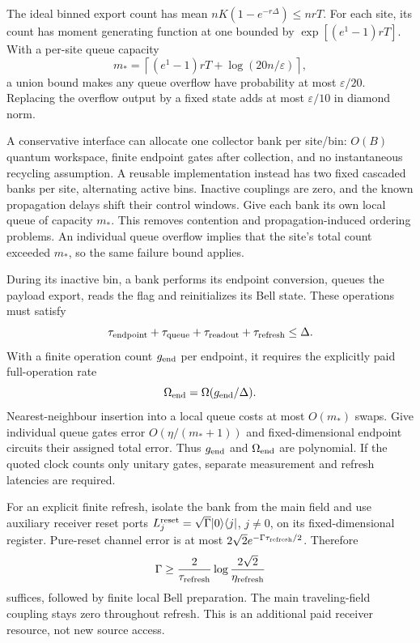\documentclass[11pt,a4paper]{article}
\begin{document}
The ideal binned export count has mean $nK(1-e^{-r\Delta})\le nrT$. For each site, its count has moment generating function at one bounded by $\exp[(e^{1}-1)rT]$. With a per-site queue capacity
\begin{equation}
m_* =\left\lceil(e^{1}-1)rT+\log(20n/\varepsilon)\right\rceil,
\end{equation}
a union bound makes any queue overflow have probability at most $\varepsilon/20$. Replacing the overflow output by a fixed state adds at most $\varepsilon/10$ in diamond norm.

A conservative interface can allocate one collector bank per site/bin: $O(B)$ quantum workspace, finite endpoint gates after collection, and no instantaneous recycling assumption. A reusable implementation instead has two fixed cascaded banks per site, alternating active bins. Inactive couplings are zero, and the known propagation delays shift their control windows. Give each bank its own local queue of capacity $m_*$. This removes contention and propagation-induced ordering problems. An individual queue overflow implies that the site's total count exceeded $m_*$, so the same failure bound applies.

During its inactive bin, a bank performs its endpoint conversion, queues the payload export, reads the flag and reinitializes its Bell state. These operations must satisfy
\begin{equation}
\tau_{\rm endpoint}+\tau_{\rm queue}+\tau_{\rm readout}+\tau_{\rm refresh}\le\Delta.
\end{equation}
With a finite operation count $g_{\rm end}$ per endpoint, it requires the explicitly paid full-operation rate
\begin{equation}
\Omega_{\rm end}=\Omega(g_{\rm end}/\Delta).
\end{equation}
Nearest-neighbour insertion into a local queue costs at most $O(m_*)$ swaps. Give individual queue gates error $O(\eta/(m_*+1))$ and fixed-dimensional endpoint circuits their assigned total error. Thus $g_{\rm end}$ and $\Omega_{\rm end}$ are polynomial. If the quoted clock counts only unitary gates, separate measurement and refresh latencies are required.

For an explicit finite refresh, isolate the bank from the main field and use auxiliary receiver reset ports $L_j^{\rm reset}=\sqrt{\Gamma}\lvert 0\rangle\langle j\rvert$, $j\ne0$, on its fixed-dimensional register. Pure-reset channel error is at most $2\sqrt2 e^{-\Gamma\tau_{\rm refresh}/2}$. Therefore
\begin{equation}
\Gamma\ge\frac{2}{\tau_{\rm refresh}}\log\frac{2\sqrt2}{\eta_{\rm refresh}}
\end{equation}
suffices, followed by finite local Bell preparation. The main traveling-field coupling stays zero throughout refresh. This is an additional paid receiver resource, not new source access.
\end{document}
